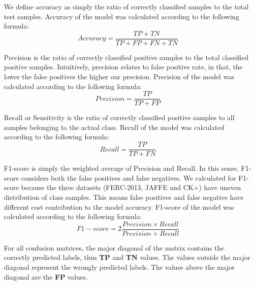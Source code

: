 \documentclass[master]{thesis-uestc}
\begin{document}
We define accuracy as simply the ratio of correctly classified samples to the total test samples. Accuracy of the model was calculated according to the following formula:
\begin{equation}
Accuracy=\frac{TP + TN}
 {TP + FP + FN + TN}
\end{equation}

Precision is the ratio of correctly classified positive samples to the total classified positive samples. Intuitively, precision relates to false positive rate, in that, the lower the false positives the higher our precision. Precision of the model was calculated according to the following formula:
\begin{equation}
Precision=\frac{TP}
 {TP + FP}
\end{equation}

Recall or Sensitivity is the ratio of correctly classified positive samples to all samples belonging to the actual class. Recall of the model was calculated according to the following formula:
\begin{equation}
Recall=\frac{TP}
 {TP + FN}
\end{equation}

F1-score is simply the weighted average of Precision and Recall. In this sense, F1-score considers both the false positives and false negatives. We calculated for F1-score because the three datasets (FERC-2013, JAFFE and CK+) have uneven distribution of class samples. This means false positives and false negative have different cost contribution to the model accuracy. F1-score of the model was calculated according to the following formula:
\begin{equation}
F1-score=2\frac{Precision \times Recall}
 {Precision + Recall}
\end{equation}

For all confusion matrices, the major diagonal of the matrix contains the correctly predicted labels, thus \textbf{TP} and \textbf{TN} values. The values outside the major diagonal represent the wrongly predicted labels. The values above the major diagonal are the \textbf{FP} values.
\end{document}
